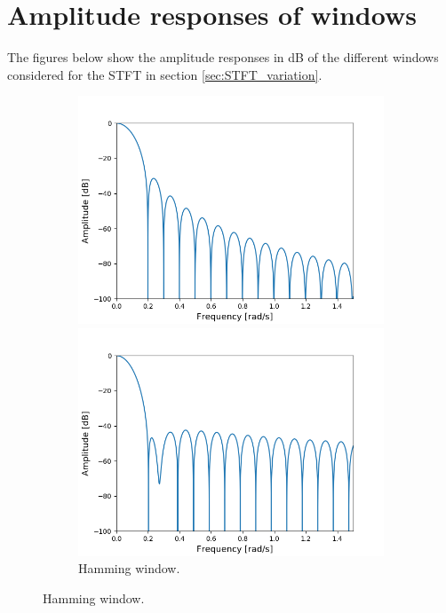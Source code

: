 \chapter{Amplitude responses of windows} \label{appD}
The figures below show the amplitude responses in dB of the different windows considered for the STFT in section \ref{sec:STFT_variation}.

\begin{figure}[H]
\centering
\begin{subfigure}{0.49\textwidth}
\centering
\includegraphics[width=\textwidth]{figures/dbplots/stft_bilag/64/hann.png}
\caption{Hann window.}
\includegraphics[width=\textwidth]{figures/dbplots/stft_bilag/64/hamming.png}
\caption{Hamming window.}

\end{subfigure}
\end{figure}

